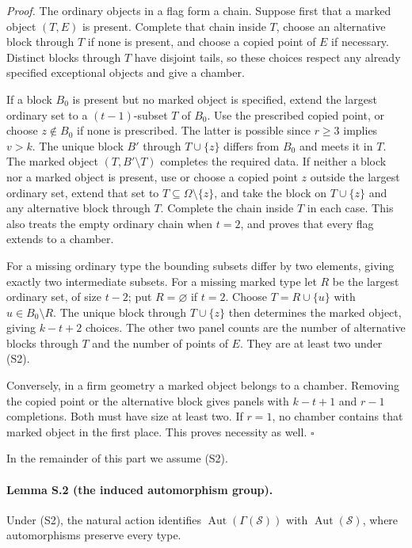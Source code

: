 \emph{Proof.}
The ordinary objects in a flag form a chain. Suppose first that a
marked object $(T,E)$ is present. Complete that chain inside $T$, choose
an alternative block through $T$ if none is present, and choose a copied
point of $E$ if necessary. Distinct blocks through $T$ have disjoint
tails, so these choices respect any already specified exceptional
objects and give a chamber.

If a block $B_0$ is present but no marked object is specified, extend
the largest ordinary set to a $(t-1)$-subset $T$ of $B_0$. Use the
prescribed copied point, or choose $z\notin B_0$ if none is prescribed.
The latter is possible since $r\geq3$ implies $v>k$. The unique block
$B'$ through $T\cup\{z\}$ differs from $B_0$ and meets it in $T$.
The marked object $(T,B'\setminus T)$ completes the required data.
If neither a block nor a marked object is present, use or choose a
copied point $z$ outside the largest ordinary set, extend that set to
$T\subseteq\Omega\setminus\{z\}$, and take the block on
$T\cup\{z\}$ and any alternative block through $T$. Complete the
chain inside $T$ in each case. This also treats the empty ordinary
chain when $t=2$, and proves that every flag extends to a chamber.

For a missing ordinary type the bounding subsets differ by two
elements, giving exactly two intermediate subsets. For a missing
marked type let $R$ be the largest ordinary set, of size $t-2$; put
$R=\varnothing$ if $t=2$. Choose $T=R\cup\{u\}$ with
$u\in B_0\setminus R$. The unique block through $T\cup\{z\}$
then determines the marked object, giving $k-t+2$ choices. The other
two panel counts are the number of alternative blocks through $T$
and the number of points of $E$. They are at least two under (S2).

Conversely, in a firm geometry a marked object belongs to a chamber.
Removing the copied point or the alternative block gives panels with
$k-t+1$ and $r-1$ completions. Both must have size at least two.
If $r=1$, no chamber contains that marked object in the first place.
This proves necessity as well. \hfill$\square$

In the remainder of this part we assume (S2).

\paragraph{Lemma S.2 (the induced automorphism group).}
Under (S2), the natural action identifies
$\operatorname{Aut}(\Gamma(\mathcal S))$ with
$\operatorname{Aut}(\mathcal S)$, where automorphisms preserve every
type.

